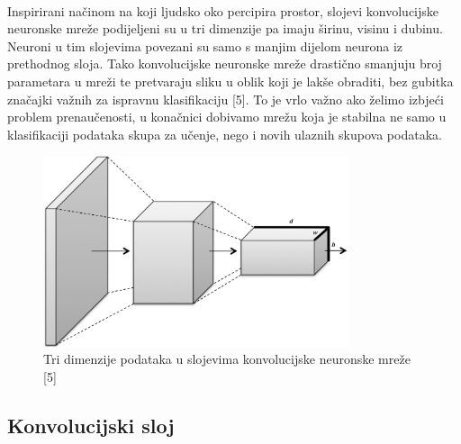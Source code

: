 \documentclass[times, utf8, zavrsni]{fer}
\begin{document}
%
\\
Inspirirani načinom na koji ljudsko oko percipira prostor, slojevi konvolucijske neuronske mreže podijeljeni su u tri dimenzije pa imaju širinu, visinu i dubinu. Neuroni u tim slojevima povezani su samo s manjim dijelom neurona iz prethodnog sloja. Tako konvolucijske neuronske mreže drastično smanjuju broj parametara u mreži te pretvaraju sliku u oblik koji je lakše obraditi, bez gubitka značajki važnih za ispravnu klasifikaciju [5]. To je vrlo važno ako želimo izbjeći problem prenaučenosti, u konačnici dobivamo mrežu koja je stabilna ne samo u klasifikaciji podataka skupa za učenje, nego i novih ulaznih skupova podataka.
%
\begin{figure}[!h]
\centering
\includegraphics[width=0.8\textwidth]{./slike/conv3}
\caption{Tri dimenzije podataka u slojevima konvolucijske neuronske mreže [5]}
\label{fig:conv2}
\end{figure}
%
\subsection*{Konvolucijski sloj}
\end{document}
